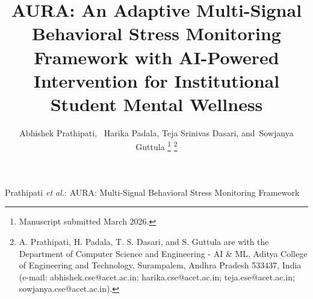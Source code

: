 \documentclass[journal]{IEEEtran}
\begin{document}
\title{AURA: An Adaptive Multi-Signal Behavioral Stress Monitoring Framework with AI-Powered Intervention for Institutional Student Mental Wellness}

\author{Abhishek Prathipati,~
        Harika Padala,
        Teja Srinivas Dasari,
        and~Sowjanya Guttula
\thanks{Manuscript submitted March 2026.}
\thanks{A. Prathipati, H. Padala, T. S. Dasari, and S. Guttula are with the Department of Computer Science and Engineering - AI \& ML, Aditya College of Engineering and Technology, Surampalem, Andhra Pradesh 533437, India (e-mail: abhishek.cse@acet.ac.in; harika.cse@acet.ac.in; teja.cse@acet.ac.in; sowjanya.cse@acet.ac.in).}}

{Prathipati \MakeLowercase{\textit{et al.}}: AURA: Multi-Signal Behavioral Stress Monitoring Framework}

\maketitle
\end{document}

